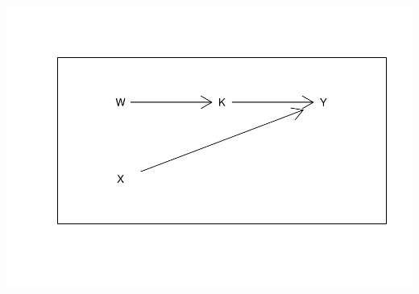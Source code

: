 \documentclass[12pt,]{book}
\begin{document}
\includegraphics{ii_files/figure-latex/unnamed-chunk-152-1.pdf}


\end{document}

